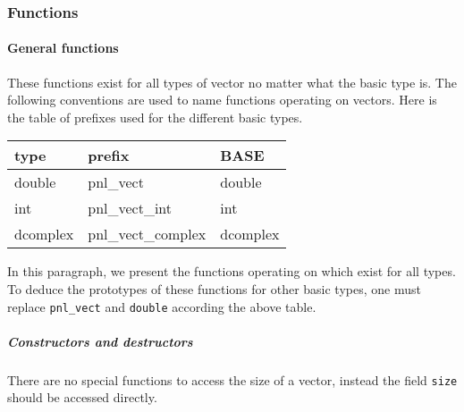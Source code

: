 \subsubsection{Functions}

\paragraph{General functions}
These functions exist for all types of vector no matter what the basic type
is. The following conventions are used to name functions operating on vectors.
Here is the table of prefixes used for the different basic types.

\begin{center}
  \begin{tabular}[t]{lll}
    type & prefix & BASE\\
    \hline
    double & pnl_vect & double \\
    \hline
    int & pnl_vect_int & int \\
    \hline
    dcomplex & pnl_vect_complex & dcomplex
  \end{tabular}
\end{center}

In this paragraph, we present the functions operating on 
which exist for all types. To deduce the prototypes of these functions for
other basic types, one must replace {\tt pnl_vect} and {\tt double} according
the above table. 
\subparagraph{Constructors and destructors}

There are no special functions to access the size of a vector, instead the field
\verb!size! should be accessed directly.

